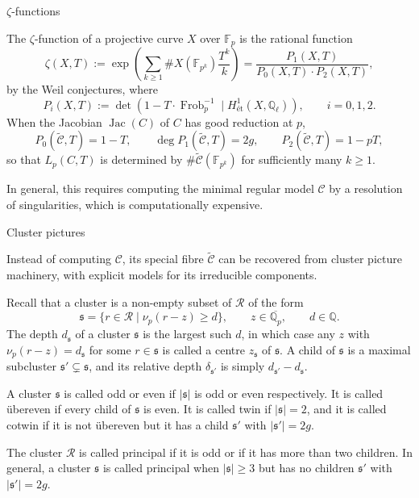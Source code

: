 \documentclass[10pt]{beamer}
\begin{document}
\begin{frame}[t]{$ \zeta $-functions}

The $ \zeta $-function of a projective curve $ X $ over $ \mathbb{F}_p $ is the rational function
$$ \zeta(X, T) := \exp\left(\sum_{k \ge 1} \#X(\mathbb{F}_{p^k})\dfrac{T^k}{k}\right) = \dfrac{P_1(X, T)}{P_0(X, T) \cdot P_2(X, T)}, $$
by the Weil conjectures, where
$$ P_i(X, T) := \det(1 - T \cdot \operatorname{Frob}_p^{-1} \mid H_{\text{\'et}}^1(X, \mathbb{Q}_\ell)), \qquad i = 0, 1, 2. $$
When the Jacobian $ \operatorname{Jac}(C) $ of $ C $ has good reduction at $ p $,
$$ P_0(\widetilde{\mathcal{C}}, T) = 1 - T, \qquad \deg P_1(\widetilde{\mathcal{C}}, T) = 2g, \qquad P_2(\widetilde{\mathcal{C}}, T) = 1 - pT, $$
so that $ L_p(C, T) $ is determined by $ \#\widetilde{\mathcal{C}}(\mathbb{F}_{p^k}) $ for sufficiently many $ k \ge 1 $.

\vspace{0.5cm} In general, this requires computing the minimal regular model $ \mathcal{C} $ by a resolution of singularities, which is computationally expensive.

\end{frame}

\begin{frame}[t]{Cluster pictures}

Instead of computing $ \mathcal{C} $, its special fibre $ \widetilde{\mathcal{C}} $ can be recovered from cluster picture machinery, with explicit models for its irreducible components.

\vspace{0.5cm} Recall that a cluster is a non-empty subset of $ \mathcal{R} $ of the form
$$ \mathfrak{s} = \{r \in \mathcal{R} \mid \nu_p(r - z) \ge d\}, \qquad z \in \overline{\mathbb{Q}_p}, \qquad d \in \mathbb{Q}. $$
The depth $ d_\mathfrak{s} $ of a cluster $ \mathfrak{s} $ is the largest such $ d $, in which case any $ z $ with $ \nu_p(r - z) = d_\mathfrak{s} $ for some $ r \in \mathfrak{s} $ is called a centre $ z_\mathfrak{s} $ of $ \mathfrak{s} $. A child of $ \mathfrak{s} $ is a maximal subcluster $ \mathfrak{s}' \subsetneq \mathfrak{s} $, and its relative depth $ \delta_{\mathfrak{s}'} $ is simply $ d_{\mathfrak{s}'} - d_\mathfrak{s} $.

\vspace{0.5cm} A cluster $ \mathfrak{s} $ is called odd or even if $ |\mathfrak{s}| $ is odd or even respectively. It is called \"ubereven if every child of $ \mathfrak{s} $ is even. It is called twin if $ |\mathfrak{s}| = 2 $, and it is called cotwin if it is not \"ubereven but it has a child $ \mathfrak{s}' $ with $ |\mathfrak{s}'| = 2g $.

\vspace{0.5cm} The cluster $ \mathcal{R} $ is called principal if it is odd or if it has more than two children. In general, a cluster $ \mathfrak{s} $ is called principal when $ |\mathfrak{s}| \ge 3 $ but has no children $ \mathfrak{s}' $ with $ |\mathfrak{s}'| = 2g $.

\end{frame}
\end{document}
